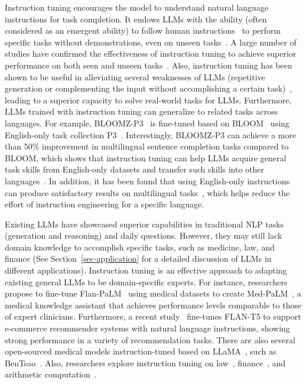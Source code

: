 Instruction tuning encourages the model to understand natural language instructions for task completion. 
It endows LLMs with the ability (often considered as an emergent ability) to follow human instructions~\cite{Wei-arxiv-2022-Emergent} to perform specific tasks without demonstrations, even on unseen tasks~\cite{Chung-arxiv-2022-Scaling}.  
A large number of studies have confirmed the effectiveness of instruction tuning to achieve superior performance on both seen and unseen tasks~\cite{Iyer-arxiv-2022-OPT,Longpre-arxiv-2023-The}. 
Also, instruction tuning has been shown to be useful in alleviating several weaknesses of LLMs (\eg repetitive generation or complementing the input without accomplishing a certain task)~\cite{Ouyang-arxiv-2022-Training,Chung-arxiv-2022-Scaling}, leading to a superior capacity to solve real-world tasks for LLMs. Furthermore, LLMs trained with instruction tuning can generalize to related tasks across languages. For example, BLOOMZ-P3~\cite{Muennighoff-2022-arxiv-Crosslingual} is fine-tuned based on BLOOM~\cite{Scao-arxiv-2022-BLOOM} using English-only task collection P3~\cite{Bach-ACL-2022-PromptSource}. Interestingly, BLOOMZ-P3 can achieve a more than 50\% improvement in multilingual sentence completion tasks compared to BLOOM, which shows that instruction tuning can help LLMs acquire general task skills from English-only datasets and transfer such skills into other languages~\cite{Muennighoff-2022-arxiv-Crosslingual}.
In addition, it has been found  that using English-only instructions can produce satisfactory results on multilingual tasks~\cite{Muennighoff-2022-arxiv-Crosslingual}, which helps reduce the effort of instruction engineering for a specific language. 

Existing LLMs have showcased superior capabilities in traditional NLP tasks (\eg generation and reasoning) and daily questions.  However, they may still lack domain knowledge to accomplish specific tasks, such as medicine, law, and finance (See Section~\ref{sec-application} for a detailed discussion of LLMs in different applications). Instruction tuning is an effective approach to adapting existing general LLMs to be domain-specific experts.
For instance, researchers propose to fine-tune Flan-PaLM~\cite{Chung-arxiv-2022-Scaling} using medical datasets to create Med-PaLM~\cite{singhal-arxiv-2022-large}, a medical knowledge assistant that achieves performance levels comparable to those of expert clinicians.
Furthermore, a recent study~\cite{Zhang-2023-arxiv-recommendation} fine-tunes FLAN-T5 to support e-commerce recommender systems with natural language instructions, showing strong performance in a variety of recommendation tasks.  
There are also several open-sourced medical models instruction-tuned based on LLaMA~\cite{Touvron-arxiv-2023-LLaMA}, such as  BenTsao~\cite{wang-arxiv-2023-huatuo}.
Also, researchers  explore instruction tuning on law~\cite{huang-arxiv-2023-lawyer}, finance~\cite{wu-arxiv-2023-bloomberggpt}, and arithmetic computation~\cite{liu-arxiv-2023-goat}. %


